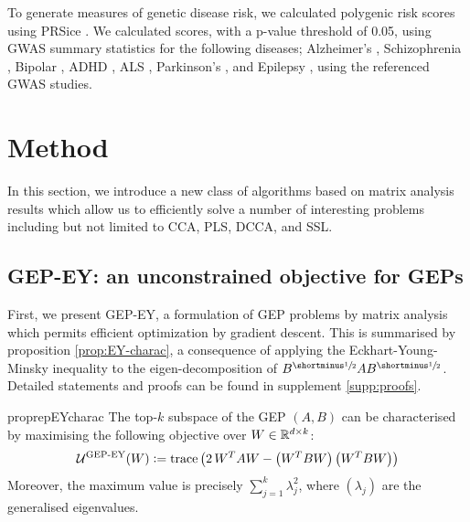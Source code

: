 To generate measures of genetic disease risk, we calculated polygenic risk scores using PRSice \cite{PRSice2014}. We calculated scores, with a p-value threshold of 0.05, using GWAS summary statistics for the following diseases; Alzheimer's \cite{Lambert2013}, Schizophrenia \cite{Trubetskoy2022}, Bipolar \cite{Mullins2021}, ADHD \cite{Demontis2023}, ALS \cite{Van_Rheenen2021}, Parkinson's \cite{Nalls2019}, and Epilepsy \cite{International_League_Against_Epilepsy_Consortium_on_Complex_Epilepsies2018}, using the referenced GWAS studies.


\section{Method}

In this section, we introduce a new class of algorithms based on matrix analysis results which allow us to efficiently solve a number of interesting problems including but not limited to CCA, PLS, DCCA, and SSL.

\subsection{GEP-EY: an unconstrained objective for GEPs}

First, we present GEP-EY, a formulation of GEP problems by matrix analysis which permits efficient optimization by gradient descent.
This is summarised by proposition \ref{prop:EY-charac}, a consequence of applying the Eckhart-Young-Minsky inequality \cite{stewart_matrix_1990} to the eigen-decomposition of $B^\mhalf A B^\mhalf$. Detailed statements and proofs can be found in supplement \ref{supp:proofs}.

\begin{restatable}{proprep}{EYcharac}
    \label{prop:EY-charac}
    The top-$k$ subspace of the GEP $(A,B)$ can be characterised by maximising the following objective over $W \in \mathbb{R}^{d \times k}$:
    \begin{align}
        \mathcal{U}^\text{GEP-EY}(W) \vcentcolon= \operatorname{trace} \left( 2\, W^T A W - \left(W^T B W\right) \left(W^T B W\right) \right)
    \end{align}
    Moreover, the maximum value is precisely $\sum_{j=1}^k \lambda_j^2$, where $(\lambda_j)$ are the generalised eigenvalues.
\end{restatable}


